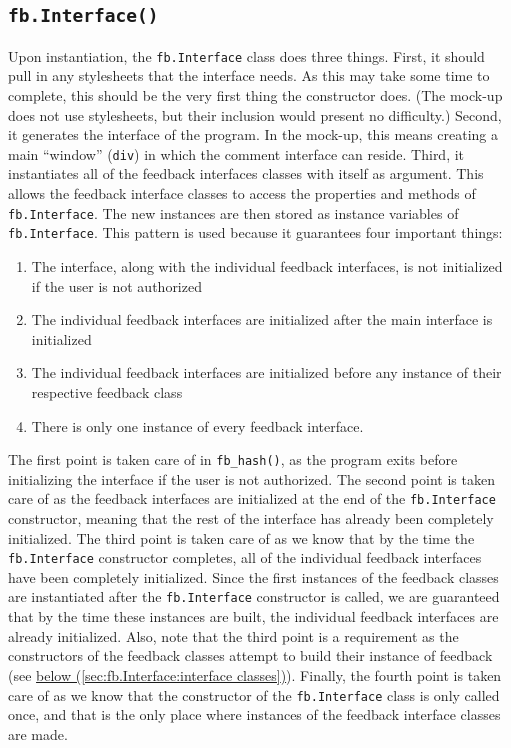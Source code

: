 \documentclass[letterpaper,12pt]{article}
\newcommand{\fb}[1]{\texttt{fb#1}}
\newcommand{\fbhash}[1]{\texttt{fb\_hash#1}}
\newcommand{\code}[1]{{\tt #1}}
\begin{document}
\subsection{\texorpdfstring{\fb{.Interface()}}{fb.Interface()}}
\label{sec:fb.Interface:fb.Interface()}
Upon instantiation, the \fb{.Interface} class does three things.  First, it should pull in any stylesheets that the interface needs.  As this may take some time to complete, this should be the very first thing the constructor does.  (The mock-up does not use stylesheets, but their inclusion would present no difficulty.)  Second, it generates the interface of the program.  In the mock-up, this means creating a main ``window'' (\code{div}) in which the comment interface can reside.  Third, it instantiates all of the feedback interfaces classes with itself as argument.  This allows the feedback interface classes to access the properties and methods of \fb{.Interface}.  The new instances are then stored as instance variables of \fb{.Interface}.  This pattern is used because it guarantees four important things:
\begin{enumerate}
 \item The interface, along with the individual feedback interfaces, is not initialized if the user is not authorized
 \item The individual feedback interfaces are initialized after the main interface is initialized
 \item The individual feedback interfaces are initialized before any instance of their respective feedback class
 \item There is only one instance of every feedback interface.
\end{enumerate}
\noindent The first point is taken care of in \fbhash{()}, as the program exits before initializing the interface if the user is not authorized.  The second point is taken care of as the feedback interfaces are initialized at the end of the \fb{.Interface} constructor, meaning that the rest of the interface has already been completely initialized.  The third point is taken care of as we know that by the time the \fb{.Interface} constructor completes, all of the individual feedback interfaces have been completely initialized.  Since the first instances of the feedback classes are instantiated after the \fb{.Interface} constructor is called, we are guaranteed that by the time these instances are built, the individual feedback interfaces are already initialized.  Also, note that the third point is a requirement as the constructors of the feedback classes attempt to build their instance of feedback (see \hyperref[sec:fb.Interface:interface classes]{below (\ref{sec:fb.Interface:interface classes})}).  Finally, the fourth point is taken care of as we know that the constructor of the \fb{.Interface} class is only called once, and that is the only place where instances of the feedback interface classes are made.
\end{document}
